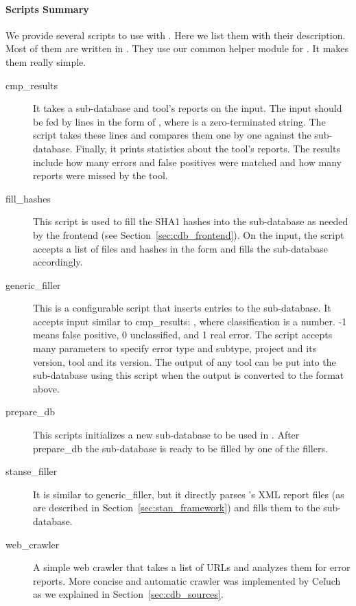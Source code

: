 \paragraph{Scripts Summary} We provide several scripts to use with \cdb. Here
we list them with their description. Most of them are written in \perl. They
use our common helper module for \perl {}. It makes them really
simple.
\begin{description}
\item[\textsf{cmp\_results}] It takes a sub-database and tool's reports on the
input. The input should be fed by lines in the form of ,
where  is a zero-terminated string. The script takes these lines
and compares them one by one against the sub-database. Finally, it prints
statistics about the tool's reports. The results include how many errors
and false positives were matched and how many reports were missed by the tool.

\item[\textsf{fill\_hashes}] This script is used to fill the SHA1 hashes into
the sub-database as needed by the frontend (see
Section~\ref{sec:cdb_frontend}).  On the input, the script accepts a list of
files and hashes in the form  and fills the sub-database
accordingly.

\item[\textsf{generic\_filler}] This is a configurable script that inserts
entries to the sub-database. It accepts input similar to
\textsf{cmp\_results}: , where
classification is a number. -1 means false positive, 0 unclassified, and 1
real error.  The script accepts many parameters to specify error type and
subtype, project and its version, tool and its version. The output of any tool
can be put into the sub-database using this script when the output is
converted to the format above.

\item[\textsf{prepare\_db}] This scripts initializes a new sub-database to be
used in \cdb. After \textsf{prepare\_db} the sub-database is ready to be
filled by one of the fillers.

\item[\textsf{stanse\_filler}] It is similar to \textsf{generic\_filler}, but
it directly parses \stan's XML report files (as are described in
Section~\ref{sec:stan_framework}) and fills them to the sub-database.

\item[\textsf{web\_crawler}] A simple web crawler that takes a list of URLs
and analyzes them for error reports. More concise and automatic crawler was
implemented by Ce\v{l}uch as we explained in Section~\ref{sec:cdb_sources}.

\end{description}

